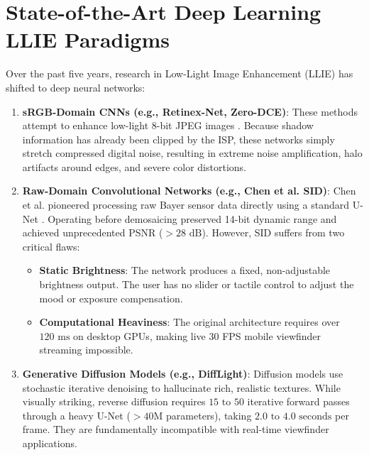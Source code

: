 \section{State-of-the-Art Deep Learning LLIE Paradigms}
Over the past five years, research in Low-Light Image Enhancement (LLIE) has shifted to deep neural networks:
\begin{enumerate}
    \item \textbf{sRGB-Domain CNNs (e.g., Retinex-Net, Zero-DCE)}:
    These methods attempt to enhance low-light 8-bit JPEG images \cite{wei2018deep, guo2020zero}. Because shadow information has already been clipped by the ISP, these networks simply stretch compressed digital noise, resulting in extreme noise amplification, halo artifacts around edges, and severe color distortions.
    \item \textbf{Raw-Domain Convolutional Networks (e.g., Chen et al. SID)}:
    Chen et al. \cite{chen2018learning} pioneered processing raw Bayer sensor data directly using a standard U-Net \cite{ronneberger2015u}. Operating before demosaicing preserved 14-bit dynamic range and achieved unprecedented PSNR ($> 28\text{ dB}$). However, SID suffers from two critical flaws:
    \begin{itemize}
        \item \textbf{Static Brightness}: The network produces a fixed, non-adjustable brightness output. The user has no slider or tactile control to adjust the mood or exposure compensation.
        \item \textbf{Computational Heaviness}: The original architecture requires over $120\text{ ms}$ on desktop GPUs, making live 30 FPS mobile viewfinder streaming impossible.
    \end{itemize}
    \item \textbf{Generative Diffusion Models (e.g., DiffLight)}:
    Diffusion models use stochastic iterative denoising to hallucinate rich, realistic textures. While visually striking, reverse diffusion requires $15\text{ to }50$ iterative forward passes through a heavy U-Net ($> 40\text{M}$ parameters), taking $2.0\text{ to }4.0\text{ seconds}$ per frame. They are fundamentally incompatible with real-time viewfinder applications.
\end{enumerate}

